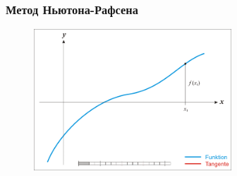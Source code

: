 \documentclass[10pt]{beamer}
\begin{document}
\begin{frame}\frametitle{Метод Ньютона-Рафсена}
\begin{figure}[htbp]
  \includegraphics[height=150pt, keepaspectratio = true]{images/newton-2}   
\end{figure}
\end{frame}
\end{document}
